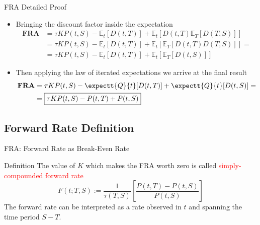 \documentclass{beamer}
\begin{document}
\begin{frame}{FRA Detailed Proof}
	\begin{itemize}
	\item<1-> Bringing the discount factor inside the expectation
	\begin{equation*}
		\begin{aligned}
		\textbf{FRA} &= \tau KP(t,S)-\mathbb{E}_t[D(t,T)] + \mathbb{E}_t\left[D(t,T)\mathbb{E}_T[D(T,S)]\right] \\
		&=\tau KP(t,S)-\mathbb{E}_t[D(t,T)] + \mathbb{E}_t\left[\mathbb{E}_T[D(t,T)D(T,S)]\right]=\\
		&=\tau KP(t,S)-\mathbb{E}_t[D(t,T)] + \mathbb{E}_t\left[\mathbb{E}_T[D(t,S)]\right]
	\end{aligned}
\end{equation*}		
		\item<2-> Then applying the law of iterated expectations we arrive at the final result
		\begin{equation*}
			\begin{aligned}
			\textbf{FRA} &= \tau KP(t,S)-\expectt{Q}{t}[D(t,T)] + \expectt{Q}{t}[D(t,S)] = \\
				&= \boxed{\tau KP(t,S) - P(t,T) + P(t,S)}
			\end{aligned}
		\end{equation*}
		\myendproof
	\end{itemize}
\end{frame}

\subsection{Forward Rate Definition}
\begin{frame}{FRA: Forward Rate as Break-Even Rate}
	\begin{block}{Definition}
		The value of $K$ which makes the FRA worth zero is called \textcolor{red}{simply-compounded forward rate}
		\begin{equation}
			F(t;T,S):=\frac{1}{\tau(T,S)}\left[\frac{P(t,T)-P(t,S)}{P(t,S)}\right]
			\label{eq:forward_rate_definition}
		\end{equation}
		The forward rate can be interpreted as a rate observed in $t$ and spanning the time period $S-T$.
	\end{block}
	
\end{frame}
\end{document}

